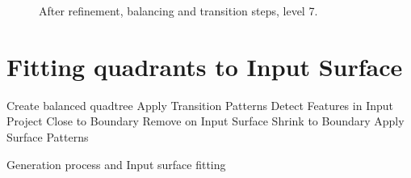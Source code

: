 \documentclass[10pt]{article}
\begin{document}
\begin{figure}[htb]
\centering
 \caption{After refinement, balancing and transition steps, level 7.}
\label{fig:generate7}
\end{figure}

\section{Fitting quadrants to Input Surface}
\label{sec:method}



\begin{algorithm}[H]

\SetAlgoLined
{}
 \nl {}
 \nl Create balanced quadtree\; \label{alg:goto}
 \nl Apply Transition Patterns\;
 \nl Detect Features in Input\;
 Project Close to Boundary\;
 Remove on Input Surface\;
 Shrink to Boundary\;
 \nl Apply Surface Patterns\;
 \caption{Generation process and Input surface fitting}
 \label{alg:surfacefitting}
\end{algorithm}
\end{document}
